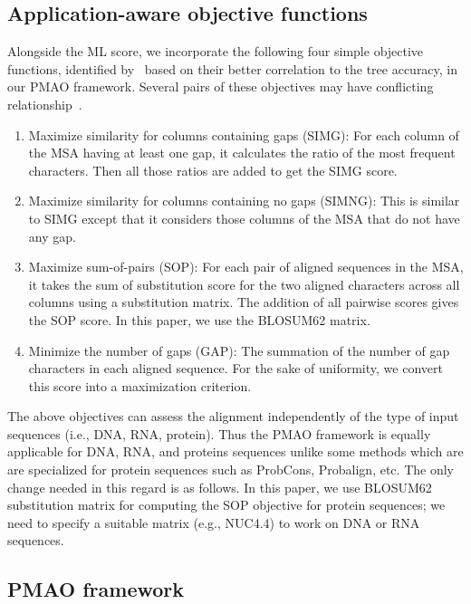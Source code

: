 \documentclass[a4paper,fleqn, review]{cas-dc}
\begin{document}
\subsection{Application-aware objective functions}
Alongside the ML score, we incorporate the following four simple objective functions, identified by~\cite{nayeem2020multiobjective} based on their better correlation to the tree accuracy, in our PMAO framework. Several pairs of these objectives may have conflicting relationship~\cite{nayeem2020multiobjective}.
\begin{enumerate}
	\item Maximize similarity for columns containing gaps (SIMG): For each column of the MSA having at least one gap, it calculates the ratio of the most frequent characters. Then all those ratios are added to get the SIMG score.
	\item Maximize similarity for columns containing no gaps (SIMNG): This is similar to SIMG except that it considers those columns of the MSA that do not have any gap.
	\item Maximize sum-of-pairs (SOP): For each pair of aligned sequences in the MSA, it takes the sum of substitution score for the two aligned characters across all columns using a substitution matrix. The addition of all pairwise scores gives the SOP score. In this paper, we use the BLOSUM62 matrix.
	\item Minimize the number of gaps (GAP): The summation of the number of gap characters in each aligned sequence. For the sake of uniformity, we convert this score into a maximization criterion.
\end{enumerate}

The above objectives can assess the alignment independently of the type of input sequences (i.e., DNA, RNA, protein). Thus the PMAO framework is equally applicable for DNA, RNA, and proteins sequences unlike some methods which are are specialized for protein sequences such as ProbCons, Probalign, etc. The only change needed in this regard is as follows. In this paper, we use BLOSUM62 substitution matrix for computing the SOP objective for protein sequences; we need to specify a suitable matrix (e.g., NUC4.4) to work on DNA or RNA sequences.

\subsection{PMAO framework}
\end{document}
